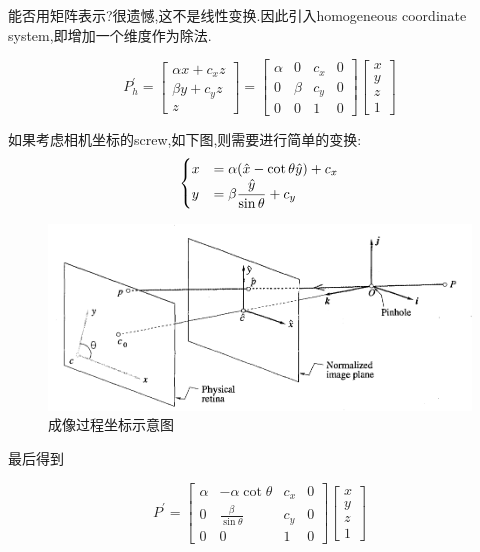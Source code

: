 能否用矩阵表示?很遗憾,这不是线性变换.因此引入homogeneous coordinate system,即增加一个维度作为除法.

\begin{equation}
	P_{h}^{\prime}=\left[\begin{array}{c}
		\alpha x+c_{x} z \\
		\beta y+c_{y} z \\
		z
	\end{array}\right]=\left[\begin{array}{cccc}
		\alpha & 0 & c_{x} & 0 \\
		0 & \beta & c_{y} & 0 \\
		0 & 0 & 1 & 0
	\end{array}\right]\left[\begin{array}{l}
		x \\
		y \\
		z \\
		1
	\end{array}\right]
\end{equation}

如果考虑相机坐标的screw,如下图,则需要进行简单的变换:
\begin{equation}
	\begin{cases}
		x &= \alpha(\hat x - \cot \theta \hat y) + c_x
		\\
		y &= \beta \displaystyle\frac{\hat{y}}{\sin \theta} + c_y
	\end{cases}
\end{equation}

\begin{figure}[htbp]
	\centering
	\includegraphics[scale=0.65]{figures/image_plane.png}
	\caption{成像过程坐标示意图}
\end{figure}

最后得到

\begin{equation}
	P^{\prime}=\left[\begin{array}{cccc}
		\alpha & -\alpha \cot \theta & c_{x} & 0 \\
		0 & \frac{\beta}{\sin \theta} & c_{y} & 0 \\
		0 & 0 & 1 & 0
	\end{array}\right]\left[\begin{array}{l}
		x \\
		y \\
		z \\
		1
	\end{array}\right]
\end{equation}

